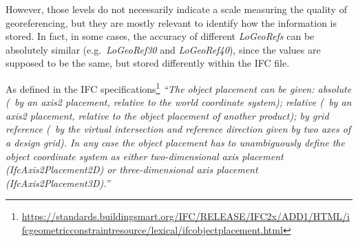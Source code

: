 However, those levels do not necessarily indicate a scale measuring the quality of georeferencing, but they are mostly relevant to identify how the information is stored.
In fact, in some cases, the accuracy of different \textit{LoGeoRefs} can be absolutely similar (e.g.\ \textit{LoGeoRef30} and \textit{LoGeoRef40}), since the values are supposed to be the same, but stored differently within the IFC file.

As defined in the IFC specifications\footnote{\url{https://standards.buildingsmart.org/IFC/RELEASE/IFC2x/ADD1/HTML/ifcgeometricconstraintresource/lexical/ifcobjectplacement.html}} \textit{``The object placement can be given:
	absolute (\ie\ by an axis2 placement, relative to the world coordinate system);
	relative (\ie\ by an axis2 placement, relative to the object placement of another product);
	by grid reference (\ie\ by the virtual intersection and reference direction given by two axes of a design grid).
	In any case the object placement has to unambiguously define the object coordinate system as either two-dimensional axis placement (IfcAxis2Placement2D) or three-dimensional axis placement (IfcAxis2Placement3D).''}

